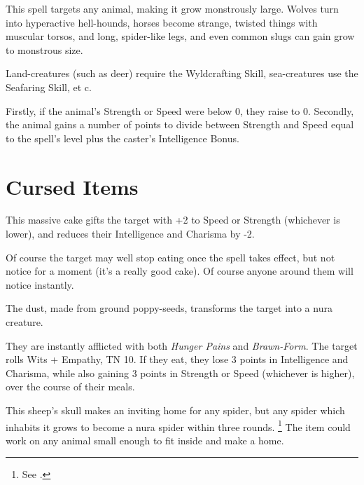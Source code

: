 \begin{multicols}{2}

This spell targets any animal, making it grow monstrously large.
Wolves turn into hyperactive hell-hounds, horses become strange, twisted things with muscular torsos, and long, spider-like legs, and even common slugs can gain grow to monstrous size.

Land-creatures (such as deer) require the Wyldcrafting Skill, sea-creatures use the Seafaring Skill, et c.

Firstly, if the animal's Strength or Speed were below 0, they raise to 0.
Secondly, the animal gains a number of points to divide between Strength and Speed equal to the spell's level plus the caster's Intelligence Bonus.

\end{multicols}

\section{Cursed Items}

\begin{multicols}{2}

\label{birthdayCake}

This massive cake gifts the target with +2 to Speed or Strength (whichever is lower), and reduces their Intelligence and Charisma by -2.

Of course the target may well stop eating once the spell takes effect, but not notice for a moment (it's a really good cake).
Of course anyone around them will notice instantly.

\label{ogredust}

The dust, made from ground poppy-seeds, transforms the target into a nura creature.

They are instantly afflicted with both \textit{Hunger Pains} and \textit{Brawn-Form}.
The target rolls Wits + Empathy, TN 10.
If they eat, they lose 3 points in Intelligence and Charisma, while also gaining 3 points in Strength or Speed (whichever is higher), over the course of their meals.

\label{spiderskull}

This sheep's skull makes an inviting home for any spider, but any spider which inhabits it grows to become a nura spider within three rounds.
\footnote{See .}
The item could work on any animal small enough to fit inside and make a home.

\end{multicols}
